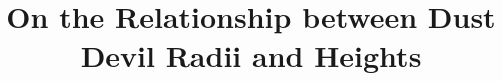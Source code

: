 \documentclass{aastex63}
\begin{document}
\title{On the Relationship between Dust Devil Radii and Heights}


\end{document}
